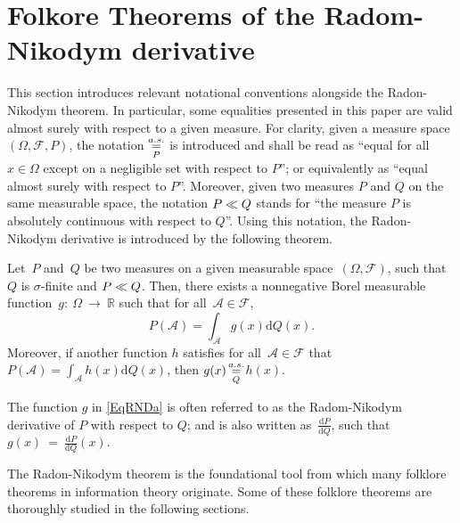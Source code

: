 \documentclass[lettersize,onecolumn]{IEEEtran}
\begin{document}
\section{Folkore Theorems of the Radom-Nikodym derivative}
\label{sec:FolkRND}
This section introduces relevant notational conventions alongside the Radon-Nikodym theorem.
%
In particular, some equalities presented in this paper are valid almost surely with respect to a given measure. For clarity, given a measure space $\left( \Omega, \mathscr{F}, P \right)$, the notation $\displaystyle\mathop{ \stackrel{a.s.}{=}}_{P}$ is introduced and shall be read as ``equal for all $x \in \Omega$ except on a negligible set with respect to $P$''; or equivalently as ``equal almost surely with respect to $P$''. Moreover, given two measures $P$ and $Q$ on the same measurable space, the notation ${P}\ll{Q}$ stands for ``the measure $P$ is absolutely continuous with respect to $Q$''.
%
Using this notation, the Radon-Nikodym derivative is introduced by the following theorem.
%
\begin{theorem}\label{ThRNT}
Let~$P$ and~$Q$ be two measures on a given measurable space~$\left( \Omega, \mathscr{F}\right)$, such that $Q$ is $
\sigma$-finite and 
$ {P}\ll{Q}$. Then, there exists a nonnegative Borel measurable 
function~$g:~\Omega~\to~\mathbb{R}$ such that for all~$\mathcal{A}\in\mathscr{F}$, 
\begin{equation}\label{EqRNDa}
 P(\mathcal{A}) = \int_{\mathcal{A}} g(x) \mathrm{d}Q(x).
\end{equation}
Moreover, if another function $h$ satisfies for all~$\mathcal{A} \in \mathscr{F}$ that~$P(\mathcal{A}) = \int_{\mathcal{A}} h(x) 
\mathrm{d}Q(x)$, then $ g(x) \displaystyle\mathop{ \stackrel{a.s.}{=}}_{Q}$$ h(x)$. 
\end{theorem}
The function $g$ in \eqref{EqRNDa} is often referred to as the Radom-Nikodym derivative of $P$ with respect to $Q$; and is also written as~$\frac{\mathrm{d}P}
{\mathrm{d}Q} $, such that~$g(x)~=~\frac{\mathrm{d}P}{\mathrm{d}Q} (x).$

The Radon-Nikodym theorem is the foundational tool from which many folklore theorems in information theory originate. Some of these folklore theorems are thoroughly studied in the following sections.
\end{document}
